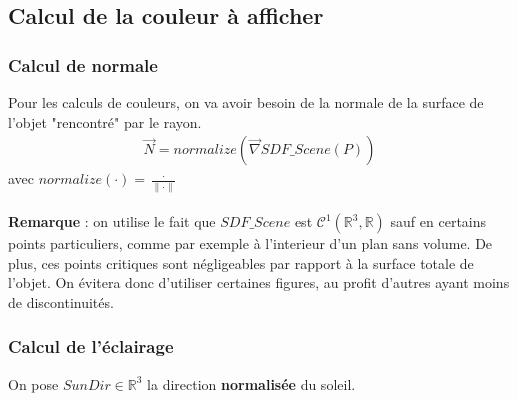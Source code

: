 \subsection{Calcul de la couleur à afficher}
\subsubsection{Calcul de normale}
Pour les calculs de couleurs, on va avoir besoin de la normale de la surface de l'objet "rencontré" par le rayon.
\begin{align*}
\Vec{N}=normalize(\Vec{\nabla}SDF\_Scene(P))
\end{align*}
avec $normalize(\cdot )=\frac{\cdot }{\|\cdot \|}$\\
\\
\textbf{Remarque} : on utilise le fait que $SDF\_Scene$ est $\mathcal{C}^1(\mathbb{R}^3,\mathbb{R})$ sauf en certains points particuliers, comme par exemple à l'interieur d'un plan sans volume. De plus, ces points critiques sont négligeables par rapport à la surface totale de l'objet. On évitera donc d'utiliser certaines figures, au profit d'autres ayant moins de discontinuités.
\subsubsection{Calcul de l'éclairage}
On pose $SunDir \in \mathbb{R}^3$ la direction \textbf{normalisée} du soleil.
